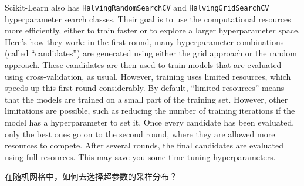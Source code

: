 Scikit-Learn also has \verb|HalvingRandomSearchCV| and \verb|HalvingGridSearchCV| hyperparameter search classes. Their goal is to use the computational resources more efficiently,
either to train faster or to explore a larger hyperparameter space. Here's how they
work: in the first round, many hyperparameter combinations (called ``candidates”) are
generated using either the grid approach or the random approach. These candidates
are then used to train models that are evaluated using cross-validation, as usual.
However, training uses limited resources, which speeds up this first round considerably. By default, ``limited resources” means that the models are trained on a small
part of the training set. However, other limitations are possible, such as reducing
the number of training iterations if the model has a hyperparameter to set it. Once
every candidate has been evaluated, only the best ones go on to the second round,
where they are allowed more resources to compete. After several rounds, the final
candidates are evaluated using full resources. This may save you some time tuning
hyperparameters.

在随机网格中，如何去选择超参数的采样分布？

